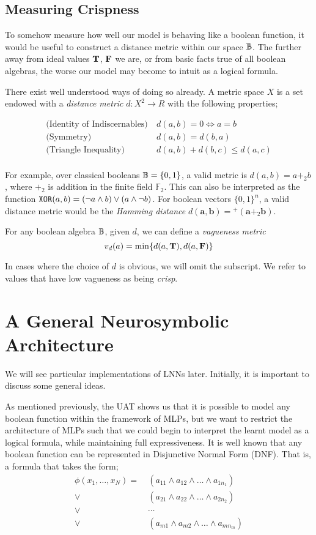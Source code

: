 \subsection{Measuring Crispness}

To somehow measure how well our model is behaving like a boolean function, it would be useful to construct a distance metric within our space $\mathbb{B}$. The further away from ideal values $\textbf{T}$, $\textbf{F}$ we are, or from basic facts true of all boolean algebras, the worse our model may become to intuit as a logical formula.

There exist well understood ways of doing so already. A metric space $X$ is a set endowed with a \textit{distance metric} $d: X^2 \to R$ with the following properties;

$$
\begin{aligned}
\text{(Identity of Indiscernables)}
&\ d(a, b) = 0 \iff a = b \\
\text{(Symmetry)}
&\ d(a, b) = d(b, a) \\
\text{(Triangle Inequality)}
&\ d(a, b) + d(b, c) \leq d(a, c) \\
\end{aligned}
$$

For example, over classical booleans $\mathbb{B} = \{0,1\}$, a valid metric is $d(a,b) = a +_2 b$, where $+_2$ is addition in the finite field $\mathbb{F}_2$. This can also be interpreted as the function $\texttt{XOR}(a,b) = (\neg a \land b) \lor (a \land \neg b)$. For boolean vectors $\{0,1\}^n$, a valid distance metric would be the \textit{Hamming distance} $d(\mathbf{a,b}) = {^+}(\mathbf{a} +_2 \mathbf{b})$.

For any boolean algebra $\mathbb{B}$, given $d$, we can define a \textit{vagueness metric}
$$v_d(a) = \min\{d(a, \textbf{T}), d(a, \textbf{F})\}$$

In cases where the choice of $d$ is obvious, we will omit the subscript. We refer to values that have low vagueness as being \textit{crisp}.

\section{A General Neurosymbolic Architecture}

We will see particular implementations of LNNs later. Initially, it is important to discuss some general ideas.

As mentioned previously, the UAT shows us that it is possible to model any boolean function within the framework of MLPs, but we want to restrict the architecture of MLPs such that we could begin to interpret the learnt model as a logical formula, while maintaining full expressiveness. It is well known that any boolean function can be represented in Disjunctive Normal Form (DNF). That is, a formula that takes the form;
$$
\begin{aligned}
\phi(x_1, \dots, x_N) =\ &(a_{11} \land a_{12} \land \dots \land a_{1n_1}) \\
\lor\ &(a_{21} \land a_{22} \land \dots \land a_{2n_2}) \\ 
\lor\ &\cdots \\
\lor\ &(a_{m1} \land a_{m2} \land \dots \land a_{mn_m})
\end{aligned}
$$

